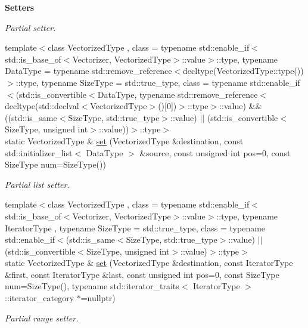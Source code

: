 \begin{Indent}{\bf Setters}
\begin{DoxyCompactItemize}
\begin{DoxyCompactList}\small\item\em Partial setter. \end{DoxyCompactList}\item 
{\footnotesize template$<$class Vectorized\-Type , class  = typename std\-::enable\-\_\-if$<$std\-::is\-\_\-base\-\_\-of$<$\-Vectorizer, Vectorized\-Type$>$\-::value$>$\-::type, typename Data\-Type  = typename std\-::remove\-\_\-reference$<$decltype(\-Vectorized\-Type\-::type())$>$\-::type, typename Size\-Type  = std\-::true\-\_\-type, class  = typename std\-::enable\-\_\-if$<$(std\-::is\-\_\-convertible$<$\-Data\-Type, typename std\-::remove\-\_\-reference$<$decltype(std\-::declval$<$\-Vectorized\-Type$>$()\mbox{[}0\mbox{]})$>$\-::type$>$\-::value) \&\& ((std\-::is\-\_\-same$<$\-Size\-Type, std\-::true\-\_\-type$>$\-::value) $|$$|$ (std\-::is\-\_\-convertible$<$\-Size\-Type, unsigned int$>$\-::value))$>$\-::type$>$ }\\static Vectorized\-Type \& \hyperlink{classmagrathea_1_1Vectorizer_af3453b370f7c850f2ab17f20d0d3fb33}{set} (Vectorized\-Type \&destination, const std\-::initializer\-\_\-list$<$ Data\-Type $>$ \&source, const unsigned int pos=0, const Size\-Type num=Size\-Type())
\begin{DoxyCompactList}\small\item\em Partial list setter. \end{DoxyCompactList}\item 
{\footnotesize template$<$class Vectorized\-Type , class  = typename std\-::enable\-\_\-if$<$std\-::is\-\_\-base\-\_\-of$<$\-Vectorizer, Vectorized\-Type$>$\-::value$>$\-::type, typename Iterator\-Type , typename Size\-Type  = std\-::true\-\_\-type, class  = typename std\-::enable\-\_\-if$<$(std\-::is\-\_\-same$<$\-Size\-Type, std\-::true\-\_\-type$>$\-::value) $|$$|$ (std\-::is\-\_\-convertible$<$\-Size\-Type, unsigned int$>$\-::value)$>$\-::type$>$ }\\static Vectorized\-Type \& \hyperlink{classmagrathea_1_1Vectorizer_ac0dd17adf7a9cc87583510b0ed84cde8}{set} (Vectorized\-Type \&destination, const Iterator\-Type \&first, const Iterator\-Type \&last, const unsigned int pos=0, const Size\-Type num=Size\-Type(), typename std\-::iterator\-\_\-traits$<$ Iterator\-Type $>$\-::iterator\-\_\-category $\ast$=nullptr)
\begin{DoxyCompactList}\small\item\em Partial range setter. \end{DoxyCompactList}\item 

\end{DoxyCompactItemize}
\end{Indent}
